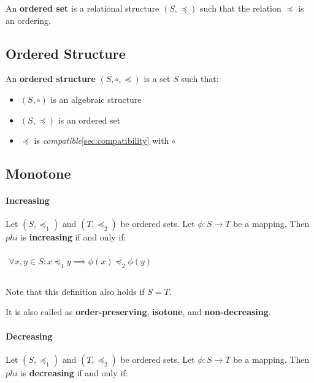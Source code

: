 An \textbf{ordered set} is a relational structure $(S, \preceq)$ such
that the relation $\preceq$ is an ordering.


\subsection{Ordered Structure}
\label{sec:ordered-structure}

An \textbf{ordered structure} $(S, \circ, \preceq)$ is a set $S$ such
that:

\begin{itemize}
\item $(S, \circ)$ is an algebraic structure
\item $(S, \preceq)$ is an ordered set
\item $\preceq$ is \textit{compatible}\ref{sec:compatibility} with
  $\circ$
\end{itemize}


\subsection{Monotone}

\paragraph{Increasing}
\label{sec:increasing}

Let $(S, \preceq_1)$ and $(T, \preceq_2)$ be ordered sets. Let
$\phi: S \to T$ be a mapping. Then $phi$ is \textbf{increasing} if and
only if:

\begin{math}
  \begin{array}{c}
    \\
    \forall x, y \in S: x \preceq_1 y \implies \phi(x) \preceq_2 \phi(y) \\
    \\
  \end{array}
\end{math}

Note that this definition also holds if $S = T$.

It is also called as \textbf{order-preserving}, \textbf{isotone}, and
\textbf{non-decreasing}.

\paragraph{Decreasing}
\label{sec:decreasing}

Let $(S, \preceq_1)$ and $(T, \preceq_2)$ be ordered sets. Let
$\phi: S \to T$ be a mapping. Then $phi$ is \textbf{decreasing} if and
only if:

